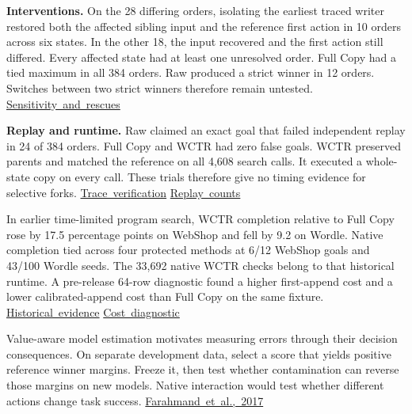 \documentclass[11pt]{article}
\newcommand{\heading}[1]{\vspace{4pt}{\sffamily\bfseries\fontsize{14}{17}\selectfont #1\par}\vspace{-1pt}}
\newcommand{\src}[2]{\mbox{\href{#1}{\sffamily\fontsize{9}{11}\selectfont #2}}}
\newcommand{\repo}{https://github.com/ZhijingWu/world-model-planning-reliability/blob/}
\newcommand{\vtwo}{\repo 8c6bfc9dc92f3e0e53be7def3b867036cb1b8e2a/studies/sciworld-prospective-v1/}
\newcommand{\runtime}{\repo 4ba67940378b959a07e63426cf4d3d3bdaf93c86/}
\newcommand{\original}{\repo 3c9022030323bd22e05b3f5276531eaa542cb1eb/}
\begin{document}
\textbf{Interventions.} On the 28 differing orders, isolating the earliest traced
writer restored both the affected sibling input and the reference first action in
10 orders across six states. In the other 18, the input recovered and the first
action still differed. Every affected state had at least one unresolved order.
Full Copy had a tied maximum in all 384 orders. Raw produced a strict winner in
12 orders. Switches between two strict winners therefore remain untested.
\src{\vtwo public/analysis.json}{Sensitivity and rescues}

\textbf{Replay and runtime.} Raw claimed an exact goal that failed independent
replay in 24 of 384 orders. Full Copy and WCTR had zero false goals. WCTR preserved
parents and matched the reference on all 4,608 search calls. It executed a whole-state
copy on every call. These trials therefore give no timing evidence for selective
forks. \src{\vtwo public/verification.json}{Trace verification}\enspace
\src{\vtwo public/analysis.json}{Replay counts}

\heading{Limits and the next test}
In earlier time-limited program search, WCTR completion relative to Full Copy rose
by 17.5 percentage points on WebShop and fell by 9.2 on Wordle. Native completion
tied across four protected methods at 6/12 WebShop goals and 43/100 Wordle seeds.
The 33,692 native WCTR checks belong to that historical runtime.
A pre-release 64-row diagnostic found a higher first-append cost and a lower
calibrated-append cost than Full Copy on the same fixture.
\src{\original CLAIMS_AND_LIMITATIONS.md}{Historical evidence}\enspace
\src{\runtime diagnostics/ast-gate/README.md}{Cost diagnostic}

Value-aware model estimation motivates measuring errors through their decision
consequences. On separate development data, select a score that yields positive
reference winner margins. Freeze it, then test whether contamination can reverse
those margins on new models. Native interaction would test whether different
actions change task success. \src{https://proceedings.mlr.press/v54/farahmand17a.html}{Farahmand et al., 2017}
\end{document}
